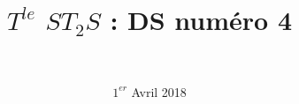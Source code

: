 \documentclass[a4paper,11pt]{exam}
\author{\ }
\date{$1^{er}$ Avril 2018}
\title{$T^{le}$ $ST_2S$ : DS num\'ero 4}
\begin{document}
%	

	\maketitle





%

\newpage 







%

\label{LastPage}
	
\end{document}
